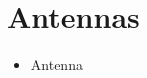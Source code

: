 \section{Antennas}
\label{sec:antenna_modelling}



\begin{itemize}
    \item Antenna
\end{itemize}







